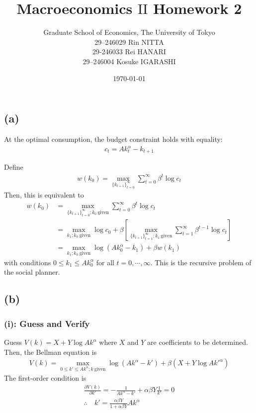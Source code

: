 \documentclass{ltjsarticle}
\title{Macroeconomics $\mathrm{II}$ Homework 2}
\date{\today}
\author{Graduate School of Economics, The University of Tokyo\\[4mm]29--246029 Rin NITTA\\ 29-246033 Rei HANARI \\ 29--246004 Kosuke IGARASHI
}
\begin{document}
\maketitle



\section{} %



\section{} %

\subsection*{(a)}

At the optimal consumption, the budget constraint holds with equality:
\begin{gather*}
    c_t = A k_t^\alpha - k_{t+1}
\end{gather*}

Define 
\begin{gather*}
    w(k_0) = \max_{\{k_{t+1}\}_{t=0}^\infty} \sum_{t=0}^\infty \beta^t \log c_t
\end{gather*}
Then, this is equivalent to
\begin{align*}
    w(k_0) 
    &= \max_{\{k_{t+1}\}_{t=0}^\infty ; k_0 \: \text{given}} \sum_{t=0}^\infty \beta^t \log c_t \\
    &= \max_{k_1; k_0 \: \text{given}} \log c_0 + \beta \left[\max_{\{k_{t+1}\}_{t=1}^\infty ; k_1 \: \text{given}} \sum_{t=1}^\infty \beta^{t-1} \log c_t \right] \\
    &= \max_{k_1; k_0 \: \text{given}} \log (A k_0^\alpha - k_1) + \beta w(k_1)
\end{align*}
with conditions $0 \leq k_1 \leq A k_0^\alpha$ for all $t = 0, \cdots, \infty$. This is the recursive problem of the social planner.

\subsection*{(b)}
\subsubsection*{(i): Guess and Verify}
Guess $V(k) = X + Y \log A k^\alpha$ where $X$ and $Y$ are coefficients to be determined.
Then, the Bellman equation is
\begin{gather*}
    V(k) = \max_{0 \leq k' \leq  A k^\alpha; k \: \text{given}} \log (A k^\alpha - k') + \beta (X + Y \log A k'^\alpha)
\end{gather*}
The first-order condition is
\begin{gather*}
    \frac{\partial V(k)}{\partial k'} = - \frac{1}{A k^\alpha - k'} + \alpha \beta Y \frac{1}{k'} = 0\\
    \therefore \quad k' = \frac{\alpha \beta Y}{1 + \alpha \beta Y} A k^\alpha
\end{gather*}
\end{document}
